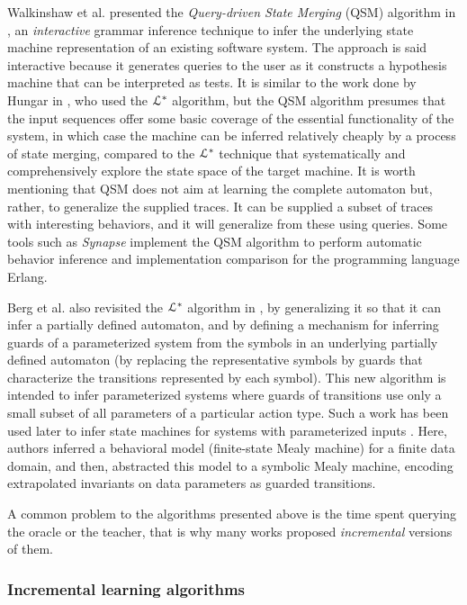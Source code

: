 Walkinshaw et al. presented the \textit{Query-driven State
Merging} (QSM) algorithm in
\cite{Walkinshaw07reverseengineering}, an \textit{interactive}
grammar inference technique to infer the underlying state machine
representation of an existing software system. The approach is
said interactive because it generates queries to the user as it
constructs a hypothesis machine that can be interpreted as
tests. It is similar to the work done by Hungar in \cite{hungar},
who used the $\EuScript{L}^*$ algorithm, but the QSM
algorithm presumes that the input sequences offer some basic
coverage of the essential functionality of the system, in which
case the machine can be inferred relatively cheaply by a process
of state merging, compared to the $\EuScript{L}^*$ technique that
systematically and comprehensively explore the state space of the
target machine. It is worth mentioning that QSM does not aim at
learning the complete automaton but, rather, to generalize the
supplied traces. It can be supplied a subset of traces with
interesting behaviors, and it will generalize from these using
queries. Some tools such as \textit{Synapse}
\cite{LamelaSeijas:2014:SAB:2633448.2633457} implement the QSM
algorithm to perform automatic behavior inference and
implementation comparison for the programming language Erlang.

Berg et al. also revisited the $\EuScript{L}^*$ algorithm in
\cite{regularinfBerg06}, by generalizing it so that it can infer
a partially defined automaton, and by defining a mechanism for
inferring guards of a parameterized system from the symbols in an
underlying partially defined automaton (by replacing the
representative symbols by guards that characterize the
transitions represented by each symbol). This new algorithm is
intended to infer parameterized systems where guards of
transitions use only a small subset of all parameters of a
particular action type. Such a work has been used later to infer
state machines for systems with parameterized inputs
\cite{regularinfBerg08}. Here, authors inferred a behavioral
model (finite-state Mealy machine) for a finite data domain, and
then, abstracted this model to a symbolic Mealy machine, encoding
extrapolated invariants on data parameters as guarded
transitions.

A common problem to the algorithms presented above is the time
spent querying the oracle or the teacher, that is why many works
proposed \textit{incremental} versions of them.

\subsubsection{Incremental learning algorithms}
\label{sec:active-increment}

